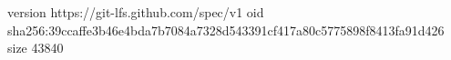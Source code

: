 version https://git-lfs.github.com/spec/v1
oid sha256:39ccaffe3b46e4bda7b7084a7328d543391cf417a80c5775898f8413fa91d426
size 43840
